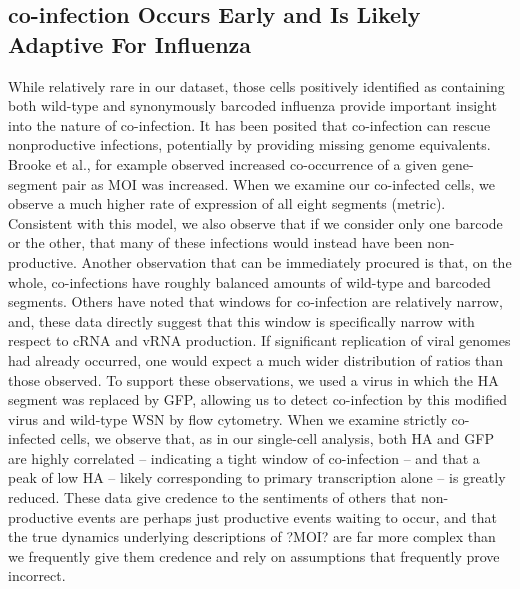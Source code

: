 \documentclass[9pt,lineno]{elife}
\begin{document}
\subsection{co-infection Occurs Early and Is Likely Adaptive For Influenza}
	While relatively rare in our dataset, those cells positively identified as containing both wild-type and synonymously barcoded influenza provide important insight into the nature of co-infection. It has been posited that co-infection can rescue nonproductive infections, potentially by providing missing genome equivalents. Brooke et al., for example observed increased co-occurrence of a given gene-segment pair as MOI was increased. When we examine our co-infected cells, we observe a much higher rate of expression of all eight segments (metric). Consistent with this model, we also observe that if we consider only one barcode or the other, that many of these infections would instead have been non-productive. Another observation that can be immediately procured is that, on the whole, co-infections have roughly balanced amounts of wild-type and barcoded segments. Others have noted that windows for co-infection are relatively narrow, and, these data directly suggest that this window is specifically narrow with respect to cRNA and vRNA production. If significant replication of viral genomes had already occurred, one would expect a much wider distribution of ratios than those observed. To support these observations, we used a virus in which the HA segment was replaced by GFP, allowing us to detect co-infection by this modified virus and wild-type WSN by flow cytometry. When we examine strictly co-infected cells, we observe that, as in our single-cell analysis, both HA and GFP are highly correlated -- indicating a tight window of co-infection -- and that a peak of low HA -- likely corresponding to primary transcription alone -- is greatly reduced. These data give credence to the sentiments of others that non-productive events are perhaps just productive events waiting to occur, and that the true dynamics underlying descriptions of ?MOI? are far more complex than we frequently give them credence and rely on assumptions that frequently prove incorrect. 
\end{document}
